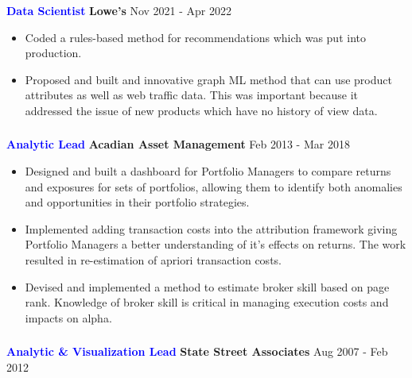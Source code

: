 \documentclass[10pt, letterpaper]{article} %
\providecommand{\tightlist}{%
  \setlength{\itemsep}{0pt}\setlength{\parskip}{0pt}}
\begin{document}
{\textbf {\textcolor{blue}{Data Scientist}} \hfill 
\textbf{Lowe's} \hfill  
Nov 2021 - Apr 2022\\
\vspace{-10pt}
\begin{itemize}
\tightlist
\item
  Coded a rules-based method for recommendations which was put into 
   production.
   
 \item  Proposed and built and innovative graph ML
  method that can use product attributes as well as web traffic data.  This was important because
  it addressed the issue of new products which have no 
    history of view data. 
\end{itemize}


\vspace{-16pt}
\hypertarget{acadian}{\subsubsection{}\label{acadian}}
\textbf {\textcolor{blue}{Analytic Lead}} \hfill 
 \textbf{Acadian Asset Management} \hfill 
Feb 2013 -  Mar 2018

\begin{itemize}
\tightlist
\item
 Designed and built a dashboard for Portfolio Managers to compare returns and exposures for sets of portfolios, 
 allowing them to identify both anomalies and opportunities in their portfolio strategies.
\item
Implemented adding transaction costs
into the attribution framework giving Portfolio Managers
a better understanding of it's effects on returns. The work resulted in re-estimation of apriori transaction costs.
\item 
  Devised and implemented a method to estimate broker skill based on page rank.
  Knowledge of broker skill is critical in managing execution costs and impacts on alpha.
\end{itemize}


\vspace{-18pt}
\hypertarget{ssa}{%
\subsubsection{}\label{ssa}}
 {\textbf {\textcolor{blue} {Analytic \& Visualization Lead}} \hfill
 \textbf{State Street Associates} \hfill  
  Aug 2007 - Feb 2012 

}}
\end{document}

